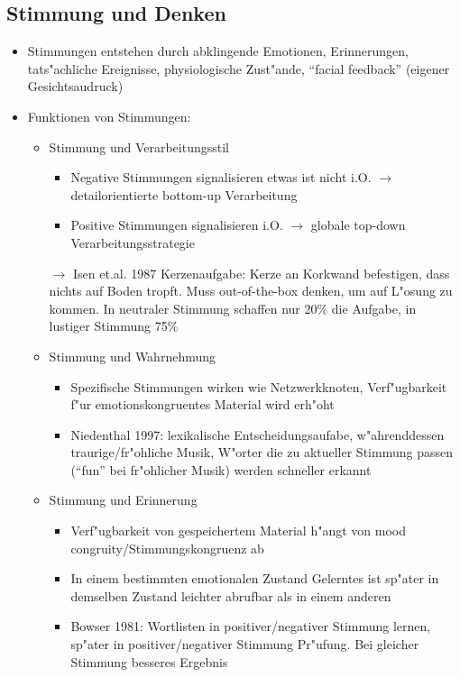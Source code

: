 \subsection{Stimmung und Denken}
\begin{itemize}
	\item
		Stimmungen entstehen durch abklingende Emotionen, Erinnerungen, tats"achliche Ereignisse, physiologische Zust"ande, \enquote{facial feedback} (eigener Gesichtsaudruck)
	\item
		Funktionen von Stimmungen:
		\begin{itemize}
			\item
				Stimmung und Verarbeitungsstil
				\begin{itemize}
					\item
						Negative Stimmungen signalisieren etwas ist nicht i.O. $\rightarrow$ detailorientierte bottom-up Verarbeitung
					\item
						Positive Stimmungen signalisieren i.O. $\rightarrow$ globale top-down Verarbeitungsstrategie
				\end{itemize}
 $\rightarrow$ Isen et.al. 1987 Kerzenaufgabe: Kerze an Korkwand befestigen, dass nichts auf Boden tropft. Muss out-of-the-box denken, um auf L"osung zu kommen. In neutraler Stimmung schaffen nur 20\% die Aufgabe, in lustiger Stimmung 75\%
			\item
				Stimmung und Wahrnehmung
				\begin{itemize}
					\item
						Spezifische Stimmungen wirken wie Netzwerkknoten, Verf"ugbarkeit f"ur emotionskongruentes Material wird erh"oht
					\item
						Niedenthal 1997: lexikalische Entscheidungsaufabe, w"ahrenddessen traurige/fr"ohliche Musik, W"orter die zu aktueller Stimmung passen (\enquote{fun} bei fr"ohlicher Musik) werden schneller erkannt
				\end{itemize}
			\item
				Stimmung und Erinnerung
				\begin{itemize}
					\item
						Verf"ugbarkeit von gespeichertem Material h"angt von mood congruity/Stimmungskongruenz ab
					\item
						In einem bestimmten emotionalen Zustand Gelerntes ist sp"ater in demselben Zustand leichter abrufbar als in einem anderen
					\item
						Bowser 1981: Wortlisten in positiver/negativer Stimmung lernen, sp"ater in positiver/negativer Stimmung Pr"ufung. Bei gleicher Stimmung besseres Ergebnis

\end{itemize}
\end{itemize}
\end{itemize}
